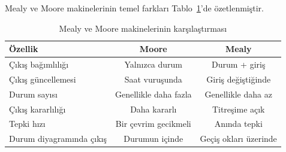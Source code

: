 Mealy ve Moore makinelerinin temel farkları Tablo~\ref{tab:B.moore-mealy}'de özetlenmiştir.

\begin{table}[H]
\centering
\caption{Mealy ve Moore makinelerinin karşılaştırması}
\label{tab:B.moore-mealy}
\begin{tabular}{lcc}
\toprule
\textbf{Özellik} & \textbf{Moore} & \textbf{Mealy} \\
\midrule
Çıkış bağımlılığı & Yalnızca durum & Durum + giriş \\
Çıkış güncellemesi & Saat vuruşunda & Giriş değiştiğinde \\
Durum sayısı & Genellikle daha fazla & Genellikle daha az \\
Çıkış kararlılığı & Daha kararlı & Titreşime açık \\
Tepki hızı & Bir çevrim gecikmeli & Anında tepki \\
Durum diyagramında çıkış & Durumun içinde & Geçiş okları üzerinde \\
\bottomrule
\end{tabular}
\end{table}

